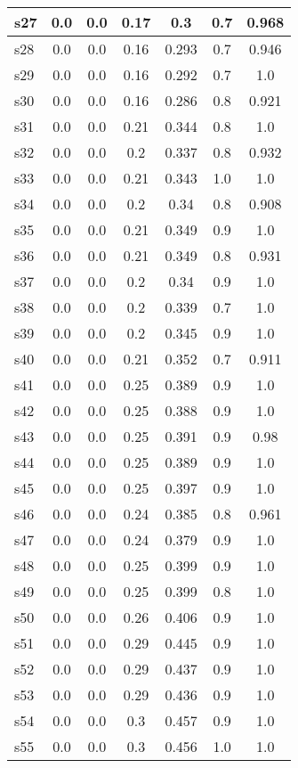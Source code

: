 \documentclass{article}
\begin{document}
\begin{tabular}{|l|c|c|c|c|c|c|}
\hline
s27 &0.0 & 0.0 & 0.17 & 0.3 & 0.7 & 0.968\\
\hline
s28 &0.0 & 0.0 & 0.16 & 0.293 & 0.7 & 0.946\\
\hline
s29 &0.0 & 0.0 & 0.16 & 0.292 & 0.7 & 1.0\\
\hline
s30 &0.0 & 0.0 & 0.16 & 0.286 & 0.8 & 0.921\\
\hline
s31 &0.0 & 0.0 & 0.21 & 0.344 & 0.8 & 1.0\\
\hline
s32 &0.0 & 0.0 & 0.2 & 0.337 & 0.8 & 0.932\\
\hline
s33 &0.0 & 0.0 & 0.21 & 0.343 & 1.0 & 1.0\\
\hline
s34 &0.0 & 0.0 & 0.2 & 0.34 & 0.8 & 0.908\\
\hline
s35 &0.0 & 0.0 & 0.21 & 0.349 & 0.9 & 1.0\\
\hline
s36 &0.0 & 0.0 & 0.21 & 0.349 & 0.8 & 0.931\\
\hline
s37 &0.0 & 0.0 & 0.2 & 0.34 & 0.9 & 1.0\\
\hline
s38 &0.0 & 0.0 & 0.2 & 0.339 & 0.7 & 1.0\\
\hline
s39 &0.0 & 0.0 & 0.2 & 0.345 & 0.9 & 1.0\\
\hline
s40 &0.0 & 0.0 & 0.21 & 0.352 & 0.7 & 0.911\\
\hline
s41 &0.0 & 0.0 & 0.25 & 0.389 & 0.9 & 1.0\\
\hline
s42 &0.0 & 0.0 & 0.25 & 0.388 & 0.9 & 1.0\\
\hline
s43 &0.0 & 0.0 & 0.25 & 0.391 & 0.9 & 0.98\\
\hline
s44 &0.0 & 0.0 & 0.25 & 0.389 & 0.9 & 1.0\\
\hline
s45 &0.0 & 0.0 & 0.25 & 0.397 & 0.9 & 1.0\\
\hline
s46 &0.0 & 0.0 & 0.24 & 0.385 & 0.8 & 0.961\\
\hline
s47 &0.0 & 0.0 & 0.24 & 0.379 & 0.9 & 1.0\\
\hline
s48 &0.0 & 0.0 & 0.25 & 0.399 & 0.9 & 1.0\\
\hline
s49 &0.0 & 0.0 & 0.25 & 0.399 & 0.8 & 1.0\\
\hline
s50 &0.0 & 0.0 & 0.26 & 0.406 & 0.9 & 1.0\\
\hline
s51 &0.0 & 0.0 & 0.29 & 0.445 & 0.9 & 1.0\\
\hline
s52 &0.0 & 0.0 & 0.29 & 0.437 & 0.9 & 1.0\\
\hline
s53 &0.0 & 0.0 & 0.29 & 0.436 & 0.9 & 1.0\\
\hline
s54 &0.0 & 0.0 & 0.3 & 0.457 & 0.9 & 1.0\\
\hline
s55 &0.0 & 0.0 & 0.3 & 0.456 & 1.0 & 1.0\\

\end{tabular}
\end{document}
